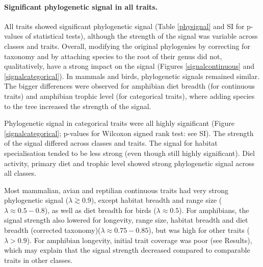 \paragraph{Significant phylogenetic signal in all traits.}
All traits showed significant phylogenetic signal (Table \ref{physignal} and SI for p-values of statistical tests), although the strength of the signal was variable across classes and traits. Overall, modifying the original phylogenies by correcting for taxonomy and by attaching species to the root of their genus did not, qualitatively, have a strong impact on the signal (Figures \ref{signalcontinuous} and \ref{signalcategorical}). In mammals and birds, phylogenetic signals remained similar. The bigger differences were observed for amphibian diet breadth (for continuous traits) and amphibian trophic level (for categorical traits), where adding species to the tree increased the strength of the signal.

Phylogenetic signal in categorical traits were all highly significant (Figure \ref{signalcategorical}; p-values for Wilcoxon signed rank test: see SI). The strength of the signal differed across classes and traits. The signal for habitat specialisation tended to be less strong (even though still highly significant). Diel activity, primary diet and trophic level showed strong phylogenetic signal across all classes. 

Most mammalian, avian and reptilian continuous traits had very strong phylogenetic signal ($\lambda \gtrsim 0.9$), except habitat breadth and range size ($\lambda \approx 0.5-0.8$), as well as diet breadth for birds ($\lambda \approx 0.5$). For amphibians, the signal strength also lowered for longevity, range size, habitat breadth and diet breadth (corrected taxonomy)($\lambda \approx 0.75-0.85$), but was high for other traits ($\lambda>0.9$). For amphibian longevity, initial trait coverage was poor (see Results), which may explain that the signal strength decreased compared to comparable traits in other classes.

